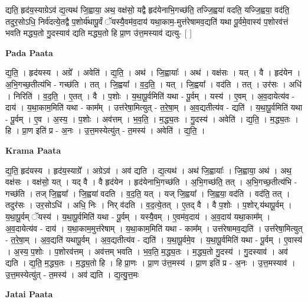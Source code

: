 \documentclass[17pt]{extarticle}
\begin{document}
द्यति॒ हृद॑य॒स्याग्रेऽव॑ द्य॒त्यथ॑ जि॒ह्वाया॒ अथ॒ वक्ष॑सो॒ यद्वै हृद॑येनाभि॒गच्छ॑ति॒ तज्जि॒ह्वया॑ वदति॒ यज्जि॒ह्वया॒ वद॑ति॒ तदुर॒सोऽधि॒ निर्व॑दत्ये॒तद्वै प॒शोर्य॑थापू॒र्वं ॅयस्यै॒वम॑व॒दाय॑ यथा॒काम॒-मुत्त॑रेषामव॒द्यति॑ यथा पू॒र्वमे॒वास्य॑ प॒शोरव॑त्तं भवति मद्ध्य॒तो गु॒दस्याव॑ द्यति मद्ध्य॒तो हि प्रा॒ण उ॑त्त॒मस्याव॑ द्यत्यु- [  ] \newline

\textbf{Pada Paata} \newline

द्य॒ति॒ । हृद॑यस्य । अग्रे᳚ । अवेति॑ । द्य॒ति॒ । अथ॑ । जि॒ह्वायाः᳚ । अथ॑ । वक्ष॑सः । यत् । वै । हृद॑येन । अ॒भि॒गच्छ॒तीत्य॑भि - गच्छ॑ति । तत् । जि॒ह्वया᳚ । व॒द॒ति॒ । यत् । जि॒ह्वया᳚ । वद॑ति । तत् । उर॑सः । अधि॑ । निरिति॑ । व॒द॒ति॒ । ए॒तत् । वै । प॒शोः । य॒था॒पू॒र्वमिति॑ यथा - पू॒र्वम् । यस्य॑ । ए॒वम् । अ॒व॒दायेत्य॑व - दाय॑ । य॒था॒काम॒मिति॑ यथा - काम᳚म् । उत्त॑रेषा॒मित्युत् - त॒रे॒षा॒म् । अ॒व॒द्यतीत्य॑व - द्यति॑ । य॒था॒पू॒र्वमिति॑ यथा - पू॒र्वम् । ए॒व । अ॒स्य॒ । प॒शोः । अव॑त्तम् । भ॒व॒ति॒ । म॒द्ध्य॒तः । गु॒दस्य॑ । अवेति॑ । द्य॒ति॒ । म॒द्ध्य॒तः । हि । प्रा॒ण इति॑ प्र - अ॒नः । उ॒त्त॒मस्येत्यु॑त् - त॒मस्य॑ । अवेति॑ । द्य॒ति॒ ।  \newline


\textbf{Krama Paata} \newline

द्य॒ति॒ हृद॑यस्य । हृद॑य॒स्याग्रे᳚ । अग्रेऽव॑ । अव॑ द्यति । द्य॒त्यथ॑ । अथ॑ जि॒ह्वायाः᳚ । जि॒ह्वाया॒ अथ॑ । अथ॒ वक्ष॑सः । वक्ष॑सो॒ यत् । यद् वै । वै हृद॑येन । हृद॑येनाभि॒गच्छ॑ति । अ॒भि॒गच्छ॑ति॒ तत् । अ॒भि॒गच्छ॒तीत्य॑भि - गच्छ॑ति । तज् जि॒ह्वया᳚ । जि॒ह्वया॑ वदति । व॒द॒ति॒ यत् । यज् जि॒ह्वया᳚ । जि॒ह्वया॒ वद॑ति । वद॑ति॒ तत् । तदुर॑सः । उर॒सोऽधि॑ । अधि॒ निः । निर् व॑दति । व॒द॒त्ये॒तत् । ए॒तद् वै । वै प॒शोः । प॒शोर्,य॑थापू॒र्वम् । य॒था॒पू॒र्वम् ॅयस्य॑ । य॒था॒पू॒र्वमिति॑ यथा - पू॒र्वम् । यस्यै॒वम् । ए॒वम॑व॒दाय॑ । अ॒व॒दाय॑ यथा॒काम᳚म् । अ॒व॒दायेत्य॑व - दाय॑ । य॒था॒काम॒मुत्त॑रेषाम् । य॒था॒काम॒मिति॑ यथा - काम᳚म् । उत्त॑रेषामव॒द्यति॑ । उत्त॑रेषा॒मित्युत् - त॒रे॒षा॒म् । अ॒व॒द्यति॑ यथापू॒र्वम् । अ॒व॒द्यतीत्य॑व - द्यति॑ । य॒था॒पू॒र्वमे॒व । य॒था॒पू॒र्वमिति॑ यथा - पू॒र्वम् । ए॒वास्य॑ । अ॒स्य॒ प॒शोः । प॒शोरव॑त्तम् । अव॑त्तम् भवति । भ॒व॒ति॒ म॒द्ध्य॒तः । म॒द्ध्य॒तो गु॒दस्य॑ । गु॒दस्याव॑ । अव॑ द्यति । द्य॒ति॒ म॒द्ध्य॒तः । म॒द्ध्य॒तो हि । हि प्रा॒णः । प्रा॒ण उ॑त्त॒मस्य॑ । प्रा॒ण इति॑ प्र - अ॒नः । उ॒त्त॒मस्याव॑ । उ॒त्त॒मस्येत्यु॑त् - त॒मस्य॑ । अव॑ द्यति । द्य॒त्यु॒त्त॒मः \newline

\textbf{Jatai Paata} \newline
\end{document}
